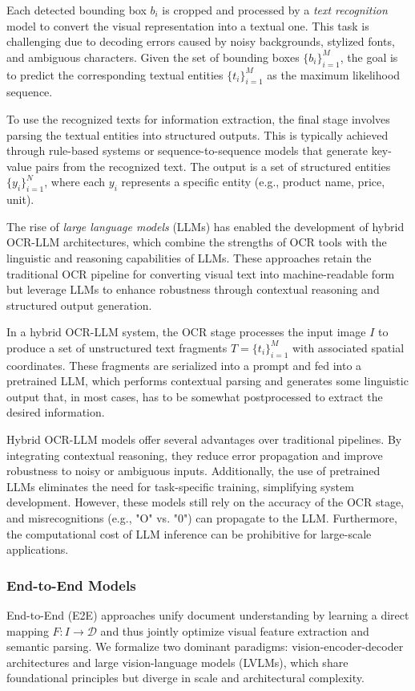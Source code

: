 \documentclass[11pt]{article}
\begin{document}
Each detected bounding box $ b_i $ is cropped and processed by a \emph{text recognition} model to convert the visual representation into a textual one. This task is challenging due to decoding errors caused by noisy backgrounds, stylized fonts, and ambiguous characters. Given the set of bounding boxes $ \{b_i\}_{i=1}^{M} $, the goal is to predict the corresponding textual entities $ \{t_i\}_{i=1}^{M} $ as the maximum likelihood sequence.

To use the recognized texts for information extraction, the final stage involves parsing the textual entities into structured outputs. This is typically achieved through rule-based systems or sequence-to-sequence models that generate key-value pairs from the recognized text. The output is a set of structured entities $ \{y_i\}_{i=1}^{N} $, where each $ y_i $ represents a specific entity (e.g., product name, price, unit).

The rise of \emph{large language models }(LLMs) has enabled the development of hybrid OCR-LLM architectures, which combine the strengths of OCR tools with the linguistic and reasoning capabilities of LLMs. These approaches retain the traditional OCR pipeline for converting visual text into machine-readable form but leverage LLMs to enhance robustness through contextual reasoning and structured output generation.

In a hybrid OCR-LLM system, the OCR stage processes the input image $ I $ to produce a set of unstructured text fragments $ T = \{t_i\}_{i=1}^{M} $ with associated spatial coordinates. These fragments are serialized into a prompt and fed into a pretrained LLM, which performs contextual parsing and generates some linguistic output that, in most cases, has to be somewhat postprocessed to extract the desired information.

Hybrid OCR-LLM models offer several advantages over traditional pipelines. By integrating contextual reasoning, they reduce error propagation and improve robustness to noisy or ambiguous inputs. Additionally, the use of pretrained LLMs eliminates the need for task-specific training, simplifying system development. However, these models still rely on the accuracy of the OCR stage, and misrecognitions (e.g., "O" vs. "0") can propagate to the LLM. Furthermore, the computational cost of LLM inference can be prohibitive for large-scale applications.

\subsubsection{End-to-End Models}  
End-to-End (E2E) approaches unify document understanding by learning a direct mapping $ F: I \to \mathcal{D} $ and thus jointly optimize visual feature extraction and semantic parsing. We formalize two dominant paradigms: vision-encoder-decoder architectures and large vision-language models (LVLMs), which share foundational principles but diverge in scale and architectural complexity.
\end{document}
